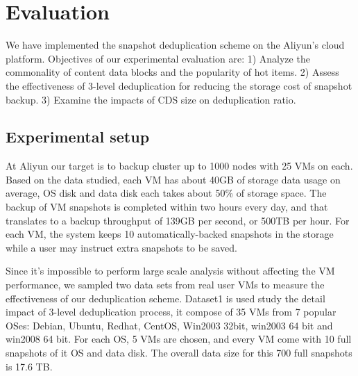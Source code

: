 
\section{Evaluation}
\label{sect:exper}

We have implemented the snapshot deduplication scheme on the Aliyun's cloud platform.
Objectives of our experimental evaluation are:
1) Analyze the commonality of content data blocks and the popularity  of hot items. 
2) Assess the effectiveness  of 3-level deduplication for reducing the storage cost of snapshot 
backup. 
3) Examine the impacts of CDS size on deduplication ratio.

\subsection{Experimental setup}

At Aliyun our target is to backup cluster up to 1000 nodes
with 25 VMs on each.
Based on the data studied,  each VM has about  40GB of storage  data usage on average,
OS disk and data disk each takes about 50\% of storage space.
The backup of VM snapshots is completed within two hours every day,
and that translates to a backup throughput of 139GB per second, or 500TB per hour.
For each VM, the system keeps 10 automatically-backed snapshots in the storage while
a user may instruct extra snapshots to be saved.



Since it's impossible to perform large scale analysis without affecting the VM performance,
we sampled two data sets from real user VMs to measure the effectiveness of our deduplication scheme.
Dataset1 is used study the detail impact of 3-level deduplication process,
it compose of 35 VMs from 7 popular OSes: 
Debian, Ubuntu, Redhat, CentOS, Win2003 32bit, win2003 64 bit and win2008 64 bit. For each OS, 
5 VMs are chosen, and every VM come with 10 full snapshots of it OS and data disk. 
The overall data size for this 700 full snapshots is 17.6 TB.

